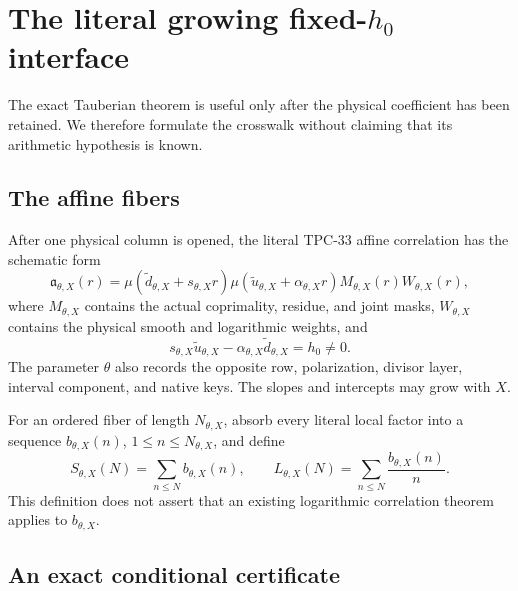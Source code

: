 \section{The literal growing fixed-\texorpdfstring{\(h_0\)}{h0} interface}
\label{sec:physical-interface}

The exact Tauberian theorem is useful only after the physical
coefficient has been retained.  We therefore formulate the
crosswalk without claiming that its arithmetic hypothesis is known.

\subsection{The affine fibers}

After one physical column is opened, the literal TPC-33 affine
correlation has the schematic form
\begin{equation}
 \mathfrak a_{\theta,X}(r)
 =
 \mu(\widetilde d_{\theta,X}+s_{\theta,X}r)
 \mu(\widetilde u_{\theta,X}+\alpha_{\theta,X}r)
 M_{\theta,X}(r)W_{\theta,X}(r),
\label{eq:literal-affine-sequence}
\end{equation}
where \(M_{\theta,X}\) contains the actual coprimality, residue, and
joint masks, \(W_{\theta,X}\) contains the physical smooth and
logarithmic weights, and
\begin{equation}
 s_{\theta,X}\widetilde u_{\theta,X}
 -\alpha_{\theta,X}\widetilde d_{\theta,X}=h_0\ne0.
\label{eq:fixed-determinant}
\end{equation}
The parameter \(\theta\) also records the opposite row,
polarization, divisor layer, interval component, and native keys.
The slopes and intercepts may grow with \(X\).

For an ordered fiber of length \(N_{\theta,X}\), absorb every literal
local factor into a sequence \(b_{\theta,X}(n)\), \(1\le n\le
N_{\theta,X}\), and define
\begin{equation}
 S_{\theta,X}(N)=\sum_{n\le N}b_{\theta,X}(n),\qquad
 L_{\theta,X}(N)=\sum_{n\le N}\frac{b_{\theta,X}(n)}n.
\label{eq:fiber-primitives}
\end{equation}
This definition does not assert that an existing logarithmic
correlation theorem applies to \(b_{\theta,X}\).

\subsection{An exact conditional certificate}

